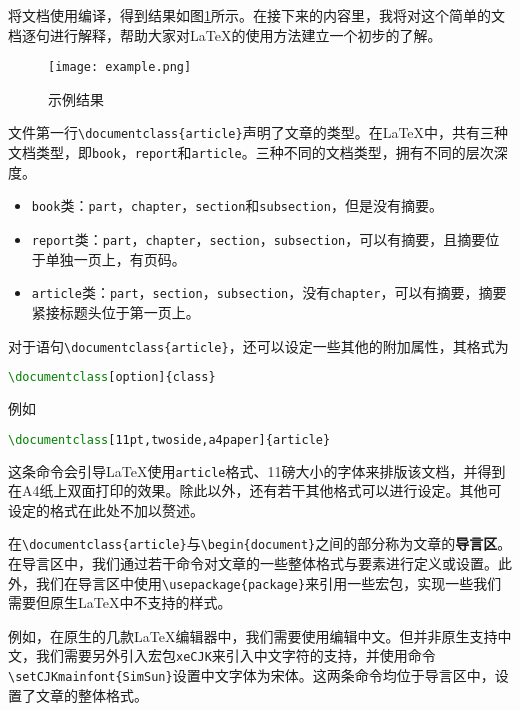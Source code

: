 将文档使用\XeLaTeX{}编译，得到结果如图\ref{example-01}所示。在接下来的内容里，我将对这个简单的文档逐句进行解释，帮助大家对\LaTeX{}的使用方法建立一个初步的了解。

\begin{figure}
    \centering
    \texttt{[image: example.png]}
    \caption{示例结果}
    \label{example-01}
\end{figure}

文件第一行\texttt{\textbackslash documentclass\{article\}}声明了文章的类型。在\LaTeX{}中，共有三种文档类型，即\texttt{book}，\texttt{report}和\texttt{article}。三种不同的文档类型，拥有不同的层次深度。

\begin{itemize}
    \item \texttt{book}类：\texttt{part}，\texttt{chapter}，\texttt{section}和\texttt{subsection}，但是没有摘要。
    \item \texttt{report}类：\texttt{part}，\texttt{chapter}，\texttt{section}，\texttt{subsection}，可以有摘要，且摘要位于单独一页上，有页码。
    \item \texttt{article}类：\texttt{part}，\texttt{section}，\texttt{subsection}，没有\texttt{chapter}，可以有摘要，摘要紧接标题头位于第一页上。
\end{itemize}

对于语句\texttt{\textbackslash documentclass\{article\}}，还可以设定一些其他的附加属性，其格式为
\begin{lstlisting}[language=tex, breaklines=true, basicstyle=\ttfamily, frame=shadowbox]
    \documentclass[option]{class}
\end{lstlisting}
例如
\begin{lstlisting}[language=tex, breaklines=true, basicstyle=\ttfamily, frame=shadowbox]
    \documentclass[11pt,twoside,a4paper]{article}
\end{lstlisting}
这条命令会引导\LaTeX{}使用\texttt{article}格式、11磅大小的字体来排版该文档，并得到在A4纸上双面打印的效果。除此以外，还有若干其他格式可以进行设定。其他可设定的格式在此处不加以赘述。

在\texttt{\textbackslash documentclass\{article\}}与\texttt{\textbackslash begin\{document\}}之间的部分称为文章的\textbf{导言区}。在导言区中，我们通过若干命令对文章的一些整体格式与要素进行定义或设置。此外，我们在导言区中使用\texttt{\textbackslash usepackage\{package\}}来引用一些宏包，实现一些我们需要但原生\LaTeX{}中不支持的样式。

例如，在原生的几款\LaTeX{}编辑器中，我们需要使用\XeLaTeX{}编辑中文。但\XeLaTeX{}并非原生支持中文，我们需要另外引入宏包\texttt{xeCJK}来引入中文字符的支持，并使用命令\texttt{\textbackslash setCJKmainfont\{SimSun\}}设置中文字体为宋体。这两条命令均位于导言区中，设置了文章的整体格式。

